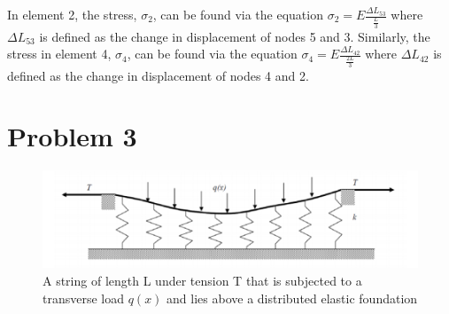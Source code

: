 \documentclass[a4paper]{article}
\begin{document}
In element 2, the stress, $\sigma_{2}$, can be found via the equation $\sigma_{2} = E \frac{\Delta L_{53}}{\frac{L}{3}}$ where $\Delta L_{53}$ is defined as the change in displacement of nodes 5 and 3. Similarly, the stress in element 4, $\sigma_{4}$, can be found via the equation $\sigma_{4} = E \frac{\Delta L_{42}}{\frac{2L}{3}}$ where $\Delta L_{42}$ is defined as the change in displacement of nodes 4 and 2.

\section*{Problem 3}

\begin{figure}[ht]
\centering
\includegraphics[scale=
.75]{AE370HW3P3.PNG}
\caption{A string of length L under tension T that is subjected to a transverse load $q(x)$ and lies above a distributed elastic foundation}
\end{figure}
\end{document}
